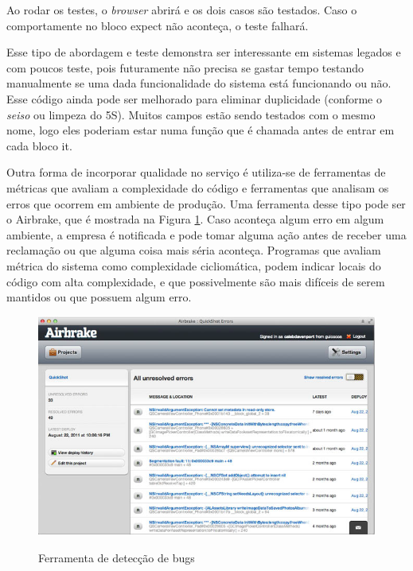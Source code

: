 Ao rodar os testes, o \textit{browser} abrirá e os dois casos são testados. Caso o comportamente no bloco expect não aconteça, o teste falhará.

Esse tipo de abordagem e teste demonstra ser interessante em sistemas legados e com poucos teste, pois futuramente não precisa se gastar tempo testando manualmente se uma dada funcionalidade do sistema está funcionando ou não. Esse código ainda pode ser melhorado para eliminar duplicidade (conforme o \textit{seiso} ou limpeza do 5S). Muitos campos estão sendo testados com o mesmo nome, logo eles poderiam estar numa função que é chamada antes de entrar em cada bloco it.

Outra forma de incorporar qualidade no serviço é utiliza-se de ferramentas de métricas que avaliam a complexidade do código e ferramentas que analisam os erros que ocorrem em ambiente de produção. Uma ferramenta desse tipo pode ser o Airbrake, que é mostrada na Figura \ref{fig:airbrake}. Caso aconteça algum erro em algum ambiente, a empresa é notificada e pode tomar alguma ação antes de receber uma reclamação ou que alguma coisa mais séria aconteça. Programas que avaliam métrica do sistema como complexidade cicliomática, podem indicar locais do código com alta complexidade, e que possivelmente são mais difíceis de serem mantidos ou que possuem algum erro.

\begin{figure}[htb!]
\begin{center}
\caption{Ferramenta de detecção de bugs}
\label{fig:airbrake}
\includegraphics[width=15cm]{assets/airbrake} \\
\end{center}
\end{figure}


